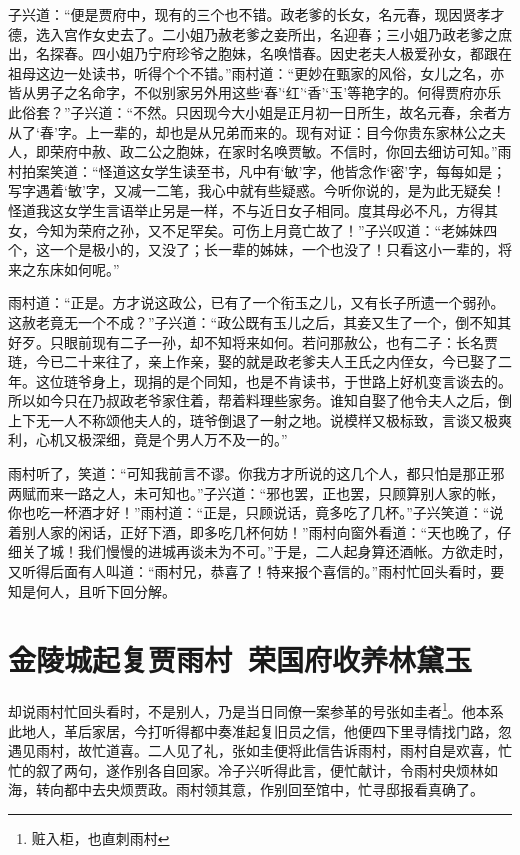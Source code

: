 \documentclass[12pt,oneside]{book}
\begin{document}
子兴道：“便是贾府中，现有的三个也不错。政老爹的长女，名元春，现因贤孝才德，选入宫作女史去了。二小姐乃赦老爹之妾所出，名迎春；三小姐乃政老爹之庶出，名探春。四小姐乃宁府珍爷之胞妹，名唤惜春。因史老夫人极爱孙女，都跟在祖母这边一处读书，听得个个不错。”雨村道：“更妙在甄家的风俗，女儿之名，亦皆从男子之名命字，不似别家另外用这些‘春’‘红’‘香’‘玉’等艳字的。何得贾府亦乐此俗套？”子兴道：“不然。只因现今大小姐是正月初一日所生，故名元春，余者方从了‘春’字。上一辈的，却也是从兄弟而来的。现有对证：目今你贵东家林公之夫人，即荣府中赦、政二公之胞妹，在家时名唤贾敏。不信时，你回去细访可知。”雨村拍案笑道：“怪道这女学生读至书，凡中有‘敏’字，他皆念作‘密’字，每每如是；写字遇着‘敏’字，又减一二笔，我心中就有些疑惑。今听你说的，是为此无疑矣！怪道我这女学生言语举止另是一样，不与近日女子相同。度其母必不凡，方得其女，今知为荣府之孙，又不足罕矣。可伤上月竟亡故了！”子兴叹道：“老姊妹四个，这一个是极小的，又没了；长一辈的姊妹，一个也没了！只看这小一辈的，将来之东床如何呢。”

雨村道：“正是。方才说这政公，已有了一个衔玉之儿，又有长子所遗一个弱孙。这赦老竟无一个不成？”子兴道：“政公既有玉儿之后，其妾又生了一个，倒不知其好歹。只眼前现有二子一孙，却不知将来如何。若问那赦公，也有二子：长名贾琏，今已二十来往了，亲上作亲，娶的就是政老爹夫人王氏之内侄女，今已娶了二年。这位琏爷身上，现捐的是个同知，也是不肯读书，于世路上好机变言谈去的。所以如今只在乃叔政老爷家住着，帮着料理些家务。谁知自娶了他令夫人之后，倒上下无一人不称颂他夫人的，琏爷倒退了一射之地。说模样又极标致，言谈又极爽利，心机又极深细，竟是个男人万不及一的。”

雨村听了，笑道：“可知我前言不谬。你我方才所说的这几个人，都只怕是那正邪两赋而来一路之人，未可知也。”子兴道：“邪也罢，正也罢，只顾算别人家的帐，你也吃一杯酒才好！”雨村道：“正是，只顾说话，竟多吃了几杯。”子兴笑道：“说着别人家的闲话，正好下酒，即多吃几杯何妨！”雨村向窗外看道：“天也晚了，仔细关了城！我们慢慢的进城再谈未为不可。”于是，二人起身算还酒帐。方欲走时，又听得后面有人叫道：“雨村兄，恭喜了！特来报个喜信的。”雨村忙回头看时，要知是何人，且听下回分解。



\chapter{金陵城起复贾雨村~荣国府收养林黛玉} 
却说雨村忙回头看时，不是别人，乃是当日同僚一案参革的号张如圭者\footnote{赃入柜，也直刺雨村}。他本系此地人，革后家居，今打听得都中奏准起复旧员之信，他便四下里寻情找门路，忽遇见雨村，故忙道喜。二人见了礼，张如圭便将此信告诉雨村，雨村自是欢喜，忙忙的叙了两句，遂作别各自回家。冷子兴听得此言，便忙献计，令雨村央烦林如海，转向都中去央烦贾政。雨村领其意，作别回至馆中，忙寻邸报看真确了。
\end{document}
